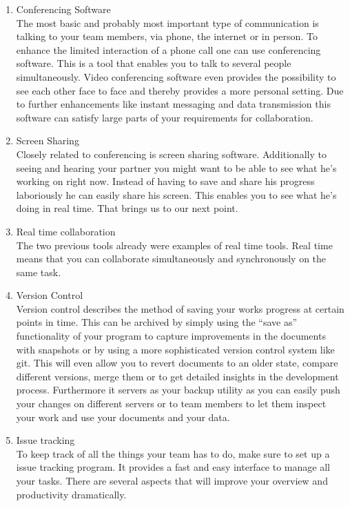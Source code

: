 \begin{multicols}{2}

\begin{enumerate}[1.]
  \item Conferencing Software\\
The most basic and probably most important type of communication is talking to your team members, via phone, the internet or in person. To enhance the limited interaction of a phone call one can use conferencing software. This is a tool that enables you to talk to several people simultaneously. Video conferencing software even provides the possibility to see each other face to face and thereby provides a more personal setting. Due to further enhancements like instant messaging and data transmission this software can satisfy large parts of your requirements for collaboration.
  \item Screen Sharing\\
Closely related to conferencing  is screen sharing software. Additionally to seeing and hearing your partner you might want to be able to see what he’s working on right now. Instead of having to save and share his progress laboriously he can easily share his screen. This enables you to see what he’s doing in real time. That brings us to our next point.
	\item Real time collaboration\\
The two previous tools already were examples of real time tools. Real time means that you can collaborate simultaneously and synchronously on the same task. 
	\item Version Control\\
Version control describes the method of saving your works progress at certain points in time. This can be archived by simply using the “save as” functionality of your program to capture improvements in the documents with snapshots or by using a more sophisticated version control system like git.
This will even allow you to revert documents to an older state, compare different versions, merge them or to get detailed insights in the development process. Furthermore it servers as your backup utility as you can easily push your changes on different servers or to team members to let them inspect your work and use your documents and your data.
	\item Issue tracking\\
To keep track of all the things your team has to do, make sure to set up a issue tracking program. It provides a fast and easy interface to manage all your tasks. There are several aspects that will improve your overview and productivity dramatically.

\end{enumerate}
\end{multicols}
